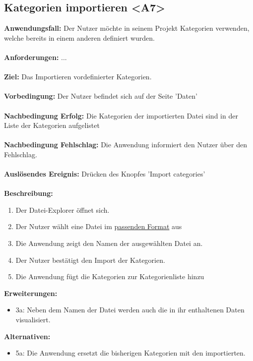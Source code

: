 \documentclass[parskip=full]{scrartcl} %
\begin{document}
\subsection*{Kategorien importieren <A7>}
\textbf{Anwendungsfall:} Der Nutzer möchte in seinem Projekt Kategorien verwenden, welche bereits in einem anderen definiert wurden.\\\\
\textbf{Anforderungen:} ...\\\\
\textbf{Ziel:} Das Importieren vordefinierter Kategorien. \\\\
\textbf{Vorbedingung:} Der Nutzer befindet sich auf der Seite 'Daten' \\\\
\textbf{Nachbedingung Erfolg:} Die Kategorien der importierten Datei sind in der Liste der Kategorien aufgelistet \\\\
\textbf{Nachbedingung Fehlschlag:} Die Anwendung informiert den Nutzer über den Fehlschlag. \\\\
\textbf{Auslösendes Ereignis:} Drücken des Knopfes 'Import categories'\\\\
\textbf{Beschreibung:}
\begin{enumerate}
    \item Der Datei-Explorer öffnet sich.
    \item Der Nutzer wählt eine Datei im \hyperlink{dataformat}{passenden Format} aus
    \item Die Anwendung zeigt den Namen der ausgewählten Datei an.
    \item Der Nutzer bestätigt den Import der Kategorien.
    \item Die Anwendung fügt die Kategorien zur Kategorienliste hinzu
\end{enumerate}
\textbf{Erweiterungen:} 
\begin{itemize}
    \item 3a: Neben dem Namen der Datei werden auch die in ihr enthaltenen Daten visualisiert.
\end{itemize}
\textbf{Alternativen:} 
\begin{itemize}
    \item 5a: Die Anwendung ersetzt die bisherigen Kategorien mit den importierten.
\end{itemize}
\newpage
\end{document}
